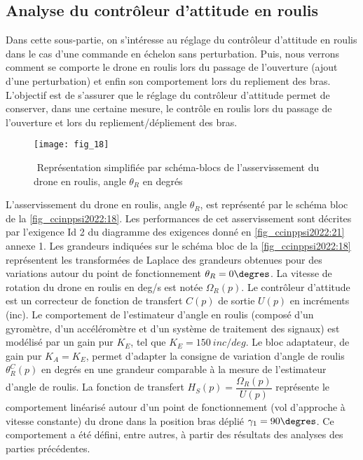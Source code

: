 \subsection{Analyse du contrôleur d’attitude en roulis}

Dans cette sous-­partie, on s’intéresse au réglage du contrôleur d’attitude en roulis dans le
cas d’une commande en échelon sans perturbation. Puis, nous verrons comment se comporte le drone en roulis lors du passage de l’ouverture (ajout d’une perturbation) et enfin
son comportement lors du repliement des bras. L’objectif est de s’assurer que le réglage du
contrôleur d’attitude permet de conserver, dans une certaine mesure, le contrôle en roulis
lors du passage de l’ouverture et lors du repliement/dépliement des bras.

\begin{figure}[H]
\centering
\texttt{[image: fig\_18]}
\caption{\label{fig_ccinppsi2022:18} ­ Représentation simplifiée par schéma-blocs de l’asservissement du drone en
roulis, angle $\theta_R$ en degrés}
\end{figure}

L’asservissement du drone en roulis, angle $\theta_R$, est représenté par le schéma bloc de la
\autoref{fig_ccinppsi2022:18}. Les performances de cet asservissement sont décrites par l’exigence Id 2 du
diagramme des exigences donné en \autoref{fig_ccinppsi2022:21} annexe 1. Les grandeurs indiquées sur le
schéma bloc de la \autoref{fig_ccinppsi2022:18} représentent les transformées de Laplace des grandeurs obtenues pour des variations autour du point de fonctionnement $\theta_R = 0\degres$. La vitesse de rotation du
drone en roulis en \si{deg/s} est notée $\Omega_R(p)$. Le contrôleur d’attitude est un correcteur de fonction de transfert $C(p)$ de sortie $U(p)$ en incréments (inc). Le comportement de l’estimateur
d’angle en roulis (composé d’un gyromètre, d’un accéléromètre et d’un système de traitement des signaux) est modélisé par un gain pur $K_E$, tel que $K_E = \SI{150}{inc/deg}$.
Le bloc adaptateur, de gain pur $K_A = K_E$, permet d’adapter la consigne de variation d’angle
de roulis $\theta_R^C(p)$ en degrés en une grandeur comparable à la mesure de l’estimateur d’angle
de roulis.
La fonction de transfert $H_S (p) = \dfrac{\Omega_R(p)}{U(p)}$ représente le comportement linéarisé autour d’un
point de fonctionnement (vol d’approche à vitesse constante) du drone dans la position bras
déplié $\gamma_1 = 90\degres$. Ce comportement a été défini, entre autres, à partir des résultats des analyses des parties précédentes.



